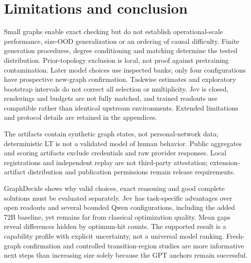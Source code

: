 \section{Limitations and conclusion}
\label{sec:limits}
Small graphs enable exact checking but do not establish operational-scale
performance, size-OOD generalization or an ordering of causal difficulty.
Finite generation procedures, degree conditioning and matching determine
the tested distribution. Prior-topology exclusion is local, not proof
against pretraining contamination. Later model choices use inspected banks;
only four configurations have prospective new-graph confirmation.
Taskwise estimates and exploratory bootstrap intervals do not correct
all selection or multiplicity. Jev is closed, renderings and budgets are
not fully matched, and trained readouts use compatible rather than
identical upstream environments. Extended limitations and protocol
details are retained in the appendices.

The artifacts contain synthetic graph states, not personal-network data;
deterministic LT is not a validated model of human behavior. Public
aggregates and scoring artifacts exclude credentials and raw provider
responses. Local registrations and independent replay are not third-party
attestation; extension-artifact distribution and publication permissions
remain release requirements.

GraphDecide shows why valid choices, exact reasoning and good complete
solutions must be evaluated separately. Jev has task-specific advantages
over open readouts and several bounded Qwen configurations, including
the added 72B baseline, yet remains far from classical optimization
quality. Mean gaps reveal differences hidden by optimum-hit counts.
The supported result is a capability profile with explicit uncertainty,
not a universal model ranking. Fresh-graph confirmation and controlled
transition-region studies are more informative next steps than increasing
size solely because the GPT anchors remain successful.
\label{sec:main-end}
